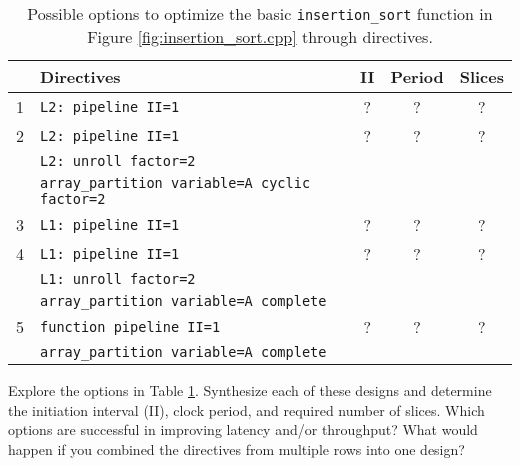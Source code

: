\begin{table}[htbp]
  \centering
  \caption{Possible options to optimize the basic \lstinline{insertion_sort} function in Figure \ref{fig:insertion_sort.cpp} through directives.}
  \label{tbl:sw_insertionsort_vs_hardwareA}
	\tabcolsep=0.2cm
	 \centering %
	 \begin{tabularx}{400pt}{cXccc}
    \toprule
     & Directives & II &  Period & Slices   \\
    \midrule
1 & \lstinline|L2: pipeline II=1|  & ? & ? & ?  \\ \midrule
2 & \lstinline|L2: pipeline II=1|& ?  & ? & ?   \\
 &\lstinline|L2: unroll factor=2|&&&\\
 &\lstinline|array_partition variable=A cyclic factor=2| &&&\\ \midrule
3 & \lstinline|L1: pipeline II=1| & ? & ? & ?      \\ \midrule
4 & \lstinline|L1: pipeline II=1| & ?  & ? & ?   \\
& \lstinline|L1: unroll factor=2| &&&\\
& \lstinline|array_partition variable=A complete| &&& \\ \midrule
5 & \lstinline|function pipeline II=1| & ? & ? & ?     \\
& \lstinline|array_partition variable=A complete| &&& \\ 
    \bottomrule
    \end{tabularx}
  \label{table:case-studies}
\end{table}

\begin{exercise}
Explore the options in Table \ref{table:case-studies}.  Synthesize each of these designs and determine the initiation interval (II), clock period, and required number of slices.  Which options are successful in improving latency and/or throughput?  What would happen if you combined the directives from multiple rows into one design?
\end{exercise}

